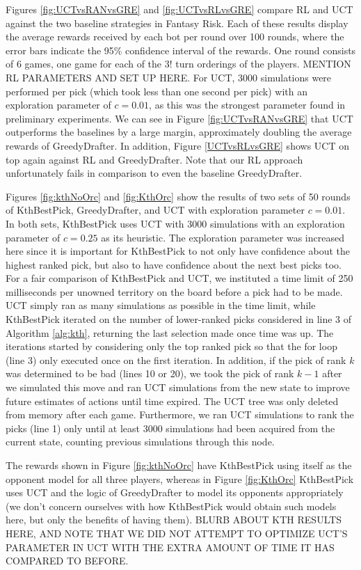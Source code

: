 \documentclass[letterpaper]{article}
\numberwithin{equation}{section}
\numberwithin{theorem}{section}
\numberwithin{lemma}{section}
\numberwithin{df}{section}
\begin{document}
Figures \ref{fig:UCTvsRANvsGRE} and \ref{fig:UCTvsRLvsGRE} compare RL and UCT against the two baseline strategies in Fantasy Risk.  Each of these results display the average rewards received by each bot per round over 100 rounds, where the error bars indicate the 95\% confidence interval of the rewards.  One round consists of 6 games, one game for each of the $3!$ turn orderings of the players.  MENTION RL PARAMETERS AND SET UP HERE.  For UCT, 3000 simulations were performed per pick (which took less than one second per pick) with an exploration parameter of $c=0.01$, as this was the strongest parameter found in preliminary experiments.  We can see in Figure \ref{fig:UCTvsRANvsGRE} that UCT outperforms the baselines by a large margin, approximately doubling the average rewards of GreedyDrafter.  In addition, Figure \ref{UCTvsRLvsGRE} shows UCT on top again against RL and GreedyDrafter.  Note that our RL approach unfortunately fails in comparison to even the baseline GreedyDrafter.  

Figures \ref{fig:kthNoOrc} and \ref{fig:KthOrc} show the results of two sets of 50 rounds of KthBestPick, GreedyDrafter, and UCT with exploration parameter $c=0.01$.  In both sets, KthBestPick uses UCT with 3000 simulations with an exploration parameter of $c=0.25$ as its heuristic.  The exploration parameter was increased here since it is important for KthBestPick to not only have confidence about the highest ranked pick, but also to have confidence about the next best picks too.  For a fair comparison of KthBestPick and UCT, we instituted a time limit of 250 milliseconds per unowned territory on the board before a pick had to be made.  UCT simply ran as many simulations as possible in the time limit, while KthBestPick iterated on the number of lower-ranked picks considered in line 3 of Algorithm \ref{alg:kth}, returning the last selection made once time was up.  The iterations started by considering only the top ranked pick so that the for loop (line 3) only executed once on the first iteration.  In addition, if the pick of rank $k$ was determined to be bad (lines 10 or 20), we took the pick of rank $k-1$ after we simulated this move and ran UCT simulations from the new state to improve future estimates of actions until time expired.  The UCT tree was only deleted from memory after each game.  Furthermore, we ran UCT simulations to rank the picks (line 1) only until at least 3000 simulations had been acquired from the current state, counting previous simulations through this node.

The rewards shown in Figure \ref{fig:kthNoOrc} have KthBestPick using itself as the opponent model for all three players, whereas in Figure \ref{fig:KthOrc} KthBestPick uses UCT and the logic of GreedyDrafter to model its opponents appropriately (we don't concern ourselves with how KthBestPick would obtain such models here, but only the benefits of having them).  BLURB ABOUT KTH RESULTS HERE, AND NOTE THAT WE DID NOT ATTEMPT TO OPTIMIZE UCT'S PARAMETER IN UCT WITH THE EXTRA AMOUNT OF TIME IT HAS COMPARED TO BEFORE.
\end{document}
